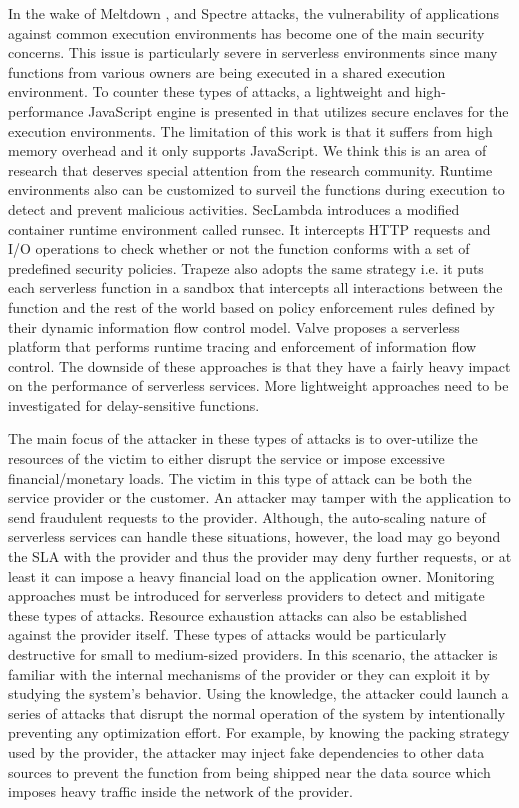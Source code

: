 In the wake of Meltdown , and Spectre  attacks, the vulnerability of applications against common execution environments has become one of the main security concerns. This issue is particularly severe in serverless environments since many functions from various owners are being executed in a shared execution environment. To counter these types of attacks, a lightweight and high-performance JavaScript engine is presented in  that utilizes secure enclaves for the execution environments. The limitation of this work is that it suffers from high memory overhead and it only supports JavaScript. We think this is an area of research that deserves special attention from the research community. 
Runtime environments also can be customized to surveil the functions during execution to detect and prevent malicious activities. SecLambda  introduces a modified container runtime environment called runsec. It intercepts HTTP requests and I/O operations to check whether or not the function conforms with a set of predefined security policies. Trapeze  also adopts the same strategy i.e. it puts each serverless function in a sandbox that intercepts all interactions between the function and the rest of the world based on policy enforcement rules defined by their dynamic information flow control model. Valve   proposes a serverless platform that performs runtime tracing and enforcement of information flow control. The downside of these approaches is that they have a fairly heavy impact on the performance of serverless services. More lightweight approaches need to be investigated for delay-sensitive functions.

The main focus of the attacker in these types of attacks is to over-utilize the resources of the victim to either disrupt the service or impose excessive financial/monetary loads. The victim in this type of attack can be both the service provider or the customer. An attacker may tamper with the application to send fraudulent requests to the provider. Although, the auto-scaling nature of serverless services can handle these situations, however, the load may go beyond the SLA with the provider and thus the provider may deny further requests, or at least it can impose a heavy financial load on the application owner. Monitoring approaches must be introduced for serverless providers to detect and mitigate these types of attacks.
Resource exhaustion attacks can also be established against the provider itself. These types of attacks would be particularly destructive for small to medium-sized providers. In this scenario, the attacker is familiar with the internal mechanisms of the provider or they can exploit it by studying the system's behavior. Using the knowledge, the attacker could launch a series of attacks that disrupt the normal operation of the system by intentionally preventing any optimization effort. For example, by knowing the packing strategy used by the provider, the attacker may inject fake dependencies to other data sources to prevent the function from being shipped near the data source which imposes heavy traffic inside the network of the provider.


